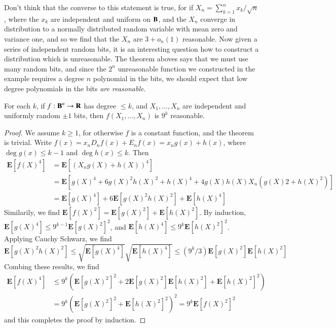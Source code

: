 Don't think that the converse to this statement is true, for if $X_n = \sum_{k = 1}^n x_k/\sqrt{n}$, where the $x_k$ are independent and uniform on $\operatorname{\mathbf{B}}$, and the $X_n$ converge in distribution to a normally distributed random variable with mean zero and variance one, and so we find that the $X_n$ are $3 + o_n(1)$ reasonable. Now given a series of independent random bits, it is an interesting question how to construct a distribution which is unreasonable. The theorem aboves says that we must use many random bits, and since the $2^n$ unreasonable function we constructed in the example requires a degree $n$ polynomial in the bits, we should expect that low degree polynomials in the bits {\it are reasonable}.

\begin{lemma}[Bonami]
    For each $k$, if $f: \operatorname{\mathbf{B}}^n \to \mathbf{R}$ has degree $\leq k$, and $X_1, \dots, X_n$ are independent and uniformly random $\pm 1$ bits, then $f(X_1, \dots, X_n)$ is $9^k$ reasonable.
\end{lemma}
\begin{proof}
    We assume $k \geq 1$, for otherwise $f$ is a constant function, and the theorem is trivial.  Write $f(x) = x_n D_n f(x) + E_n f(x) = x_n g(x) + h(x)$, where $\deg g(x) \leq k - 1$ and $\deg h(x) \leq k$. Then
    \begin{align*}
        \mathbf{E}[f(X)^4] &= \mathbf{E}[(X_n g(X) + h(X))^4]\\
        &= \mathbf{E}[g(X)^4 + 6 g(X)^2 h(X)^2 + h(X)^4 + 4 g(X) h(X) X_n (g(X)2 + h(X)^2)]\\
        &= \mathbf{E}[g(X)^4] + 6 \mathbf{E}[g(X)^2 h(X)^2] + \mathbf{E}[h(X)^4]
    \end{align*}
    Similarily, we find $\mathbf{E}[f(X)^2] = \mathbf{E}[g(X)^2] + \mathbf{E}[h(X)^2]$. By induction, $\mathbf{E}[g(X)^4] \leq 9^{k-1} \mathbf{E}[g(X)^2]^2$, and $\mathbf{E}[h(X)^4] \leq 9^k \mathbf{E}[h(X)^2]^2$. Applying Cauchy Schwarz, we find
    \[ \mathbf{E}[g(X)^2 h(X)^2] \leq \sqrt{\mathbf{E}[g(X)^4]}\sqrt{\mathbf{E}[h(X)^4]} \leq (9^k/3) \mathbf{E}[g(X)^2] \mathbf{E}[h(X)^2] \]
    Combing these results, we find
    \begin{align*}
        \mathbf{E}[f(X)^4] &\leq 9^k \left( \mathbf{E}[g(X)^2]^2 + 2 \mathbf{E}[g(X)^2] \mathbf{E}[h(X)^2] + \mathbf{E}[h(X)^2]^2 \right)\\
        &= 9^k (\mathbf{E}[g(X)^2]^2 + \mathbf{E}[h(X)^2]^2)^2 = 9^k \mathbf{E}[f(X)^2]^2
    \end{align*}
    and this completes the proof by induction.
\end{proof}

